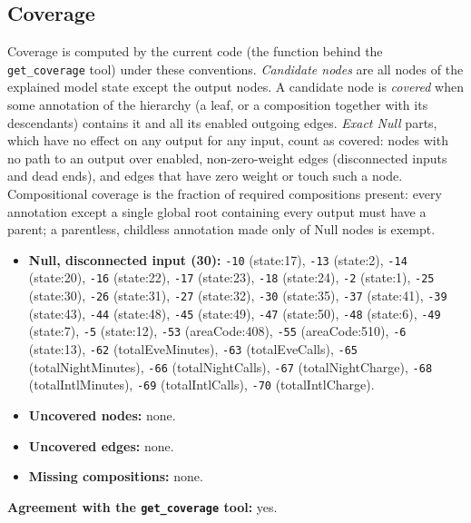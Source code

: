 \begin{drafted}
\subsection{Coverage}\label{app:churn100-s4-c3:coverage}
Coverage is computed by the current code (the function behind the \texttt{get\_coverage} tool) under these conventions. \emph{Candidate nodes} are all nodes of the explained model state except the output nodes. A candidate node is \emph{covered} when some annotation of the hierarchy (a leaf, or a composition together with its descendants) contains it and all its enabled outgoing edges. \emph{Exact Null} parts, which have no effect on any output for any input, count as covered: nodes with no path to an output over enabled, non-zero-weight edges (disconnected inputs and dead ends), and edges that have zero weight or touch such a node. Compositional coverage is the fraction of required compositions present: every annotation except a single global root containing every output must have a parent; a parentless, childless annotation made only of Null nodes is exempt.

\begin{itemize}
\item \textbf{Null, disconnected input (30):} \texttt{-10} (state:17), \texttt{-13} (state:2), \texttt{-14} (state:20), \texttt{-16} (state:22), \texttt{-17} (state:23), \texttt{-18} (state:24), \texttt{-2} (state:1), \texttt{-25} (state:30), \texttt{-26} (state:31), \texttt{-27} (state:32), \texttt{-30} (state:35), \texttt{-37} (state:41), \texttt{-39} (state:43), \texttt{-44} (state:48), \texttt{-45} (state:49), \texttt{-47} (state:50), \texttt{-48} (state:6), \texttt{-49} (state:7), \texttt{-5} (state:12), \texttt{-53} (areaCode:408), \texttt{-55} (areaCode:510), \texttt{-6} (state:13), \texttt{-62} (totalEveMinutes), \texttt{-63} (totalEveCalls), \texttt{-65} (totalNightMinutes), \texttt{-66} (totalNightCalls), \texttt{-67} (totalNightCharge), \texttt{-68} (totalIntlMinutes), \texttt{-69} (totalIntlCalls), \texttt{-70} (totalIntlCharge).
\item \textbf{Uncovered nodes:} none.
\item \textbf{Uncovered edges:} none.
\item \textbf{Missing compositions:} none.
\end{itemize}
\noindent\textbf{Agreement with the \texttt{get\_coverage} tool:} yes.


\end{drafted}
